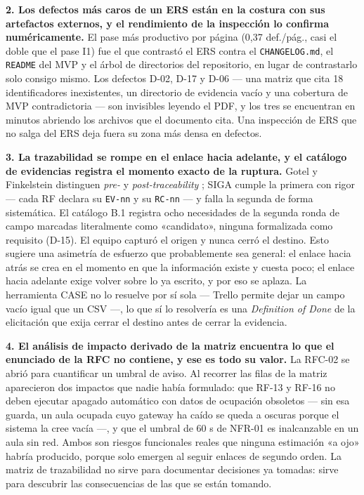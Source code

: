 \documentclass[11pt,letterpaper]{article}
\begin{document}
\textbf{2. Los defectos más caros de un ERS están en la costura con sus artefactos externos, y el rendimiento de la inspección lo confirma numéricamente.} El pase más productivo por página (0,37 def./pág., casi el doble que el pase I1) fue el que contrastó el ERS contra el \texttt{CHANGELOG.md}, el \texttt{README} del MVP y el árbol de directorios del repositorio, en lugar de contrastarlo solo consigo mismo. Los defectos D-02, D-17 y D-06 --- una matriz que cita 18 identificadores inexistentes, un directorio de evidencia vacío y una cobertura de MVP contradictoria --- son invisibles leyendo el PDF, y los tres se encuentran en minutos abriendo los archivos que el documento cita. Una inspección de ERS que no salga del ERS deja fuera su zona más densa en defectos.

\textbf{3. La trazabilidad se rompe en el enlace hacia adelante, y el catálogo de evidencias registra el momento exacto de la ruptura.} Gotel y Finkelstein distinguen \emph{pre-} y \emph{post-traceability} \cite{gotel1994}; SIGA cumple la primera con rigor --- cada RF declara su \texttt{EV-nn} y su \texttt{RC-nn} --- y falla la segunda de forma sistemática. El catálogo B.1 registra ocho necesidades de la segunda ronda de campo marcadas literalmente como «candidato», ninguna formalizada como requisito (D-15). El equipo capturó el origen y nunca cerró el destino. Esto sugiere una asimetría de esfuerzo que probablemente sea general: el enlace hacia atrás se crea en el momento en que la información existe y cuesta poco; el enlace hacia adelante exige volver sobre lo ya escrito, y por eso se aplaza. La herramienta CASE no lo resuelve por sí sola --- Trello permite dejar un campo vacío igual que un CSV ---, lo que sí lo resolvería es una \emph{Definition of Done} de la elicitación que exija cerrar el destino antes de cerrar la evidencia.

\textbf{4. El análisis de impacto derivado de la matriz encuentra lo que el enunciado de la RFC no contiene, y ese es todo su valor.} La RFC-02 se abrió para cuantificar un umbral de aviso. Al recorrer las filas de la matriz aparecieron dos impactos que nadie había formulado: que RF-13 y RF-16 no deben ejecutar apagado automático con datos de ocupación obsoletos --- sin esa guarda, un aula ocupada cuyo gateway ha caído se queda a oscuras porque el sistema la cree vacía ---, y que el umbral de 60 s de NFR-01 es inalcanzable en un aula sin red. Ambos son riesgos funcionales reales que ninguna estimación «a ojo» habría producido, porque solo emergen al seguir enlaces de segundo orden. La matriz de trazabilidad no sirve para documentar decisiones ya tomadas: sirve para descubrir las consecuencias de las que se están tomando.
\end{document}
